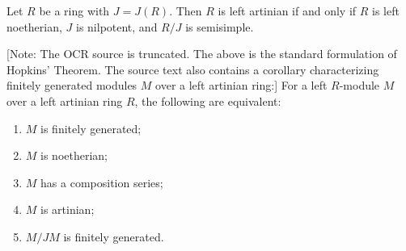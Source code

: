 Let $R$ be a ring with $J = J(R)$. Then $R$ is left artinian if and only if $R$ is left noetherian, $J$ is nilpotent, and $R/J$ is semisimple.

[Note: The OCR source is truncated. The above is the standard formulation of Hopkins' Theorem. The source text also contains a corollary characterizing finitely generated modules $M$ over a left artinian ring:]
For a left $R$-module $M$ over a left artinian ring $R$, the following are equivalent:
\begin{enumerate}
\item[(a)] $M$ is finitely generated;
\item[(b)] $M$ is noetherian;
\item[(c)] $M$ has a composition series;
\item[(d)] $M$ is artinian;
\item[(e)] $M/JM$ is finitely generated.
\end{enumerate}
